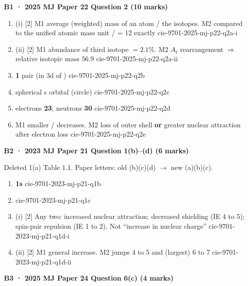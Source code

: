 \documentclass[10pt,a4paper]{article}
\begin{document}
\vspace{0.35em}
{\normalsize\bfseries B1 · 2025 MJ Paper 22 Question 2 (10 marks)}

\begin{enumerate}[label=\textbf{(\alph*)}, leftmargin=1.8em]
\item[] (i) [2] M1 average (weighted) mass of an atom / the isotopes. M2 compared to the unified atomic mass unit /  = 12 exactly \hfill {\footnotesize cie-9701-2025-mj-p22-q2a-i}
\item[] (ii) [2] M1 abundance of third isotope $=2.1\%$. M2 $A_\mathrm{r}$ rearrangement $\Rightarrow$ relative isotopic mass $\mathbf{56.9}$ \hfill {\footnotesize cie-9701-2025-mj-p22-q2a-ii}
\item [1] \textbf{1} pair (in 3d of ) \hfill {\footnotesize cie-9701-2025-mj-p22-q2b}
\item [1] spherical s orbital (circle) \hfill {\footnotesize cie-9701-2025-mj-p22-q2c}
\item [2] electrons \textbf{23}; neutrons \textbf{30} \hfill {\footnotesize cie-9701-2025-mj-p22-q2d}
\item [2] M1 smaller / decreases. M2 loss of outer shell \textbf{or} greater nuclear attraction after electron loss \hfill {\footnotesize cie-9701-2025-mj-p22-q2e}
\end{enumerate}

{\normalsize\bfseries B2 · 2023 MJ Paper 21 Question 1(b)--(d) (6 marks)}

{\small Deleted 1(a) Table 1.1. Paper letters: old (b)(c)(d) $\rightarrow$ new (a)(b)(c).}

\begin{enumerate}[label=\textbf{(\alph*)}, leftmargin=1.8em]
\item [1] \textbf{1s} \hfill {\footnotesize cie-9701-2023-mj-p21-q1b}
\item [1]  \hfill {\footnotesize cie-9701-2023-mj-p21-q1c}
\item[] (i) [2] Any two: increased nuclear attraction; decreased shielding (IE 4 to 5); spin-pair repulsion (IE 1 to 2). Not ``increase in nuclear charge'' \hfill {\footnotesize cie-9701-2023-mj-p21-q1d-i}
\item[] (ii) [2] M1 general increase. M2 jumps 4 to 5 and (largest) 6 to 7 \hfill {\footnotesize cie-9701-2023-mj-p21-q1d-ii}
\end{enumerate}

{\normalsize\bfseries B3 · 2025 MJ Paper 24 Question 6(c) (4 marks)}
\end{document}
